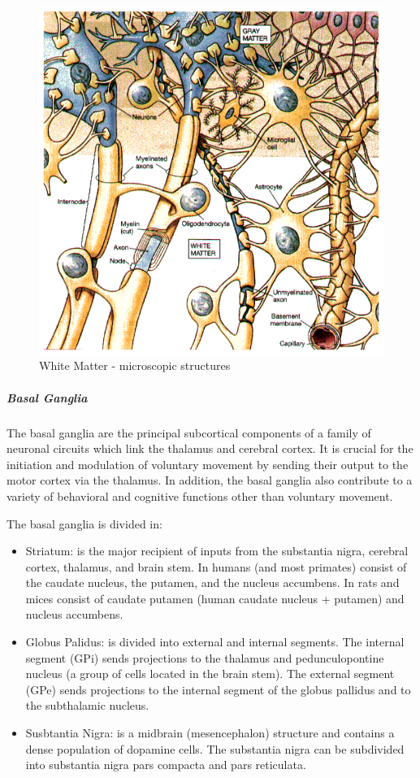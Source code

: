 \documentclass[12pt,article,oneside,a4paper]{memoir}
\begin{document}
\begin{figure}
  \centering
  \includegraphics[width=12cm]{imgs/microscopic_whiteMatter.png}
  \caption{White Matter - microscopic structures}
  \label{fig:microscopic_whiteMatter}
\end{figure}

\subparagraph{Basal Ganglia}

The basal ganglia are the principal subcortical components of a family of neuronal circuits which link the thalamus and cerebral cortex. It is crucial for the initiation and modulation of voluntary movement by sending their output to the motor cortex via the thalamus. In addition, the basal ganglia also contribute to a variety of behavioral and cognitive functions other than voluntary movement.

The basal ganglia is divided in:
\begin{itemize}
\item Striatum: is the major recipient of inputs from the substantia nigra, cerebral cortex, thalamus, and brain stem. In humans (and most primates) consist of the caudate nucleus, the putamen, and the nucleus accumbens. In rats and mices consist of caudate putamen (human caudate nucleus + putamen) and nucleus accumbens.
\item Globus Palidus: is divided into external and internal segments.
\subitem The internal segment (GPi) sends projections to the thalamus and pedunculopontine nucleus (a group of cells located in the brain stem).
\subitem The external segment (GPe) sends projections to the internal segment of the globus pallidus and to the subthalamic nucleus.
\item Susbtantia Nigra: is a midbrain (mesencephalon) structure and contains a dense population of dopamine cells. The substantia nigra can be subdivided into substantia nigra pars compacta and pars reticulata.
\end{itemize}
\end{document}
